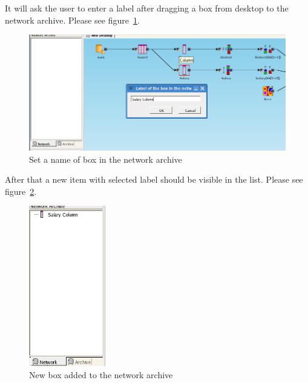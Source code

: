 \documentclass[a4paper,12pt]{book}
\begin{document}
It will ask the user to enter a label after dragging a box from desktop to the network archive. Please see figure~\ref{fig:setNameInNA}.
\begin{figure}
	\includegraphics[width=1\textwidth]{set_name_of_box_in_network_archive}
	\caption{Set a name of box in the network archive}
	\label{fig:setNameInNA}
\end{figure}

After that a new item with selected label should be visible in the list. Please see figure~\ref{fig:addedToNA}.
\begin{figure}
	\centering
	\includegraphics[height=7cm]{network_archive_box_added}
	\caption{New box added to the network archive}
	\label{fig:addedToNA}
\end{figure}
\end{document}
